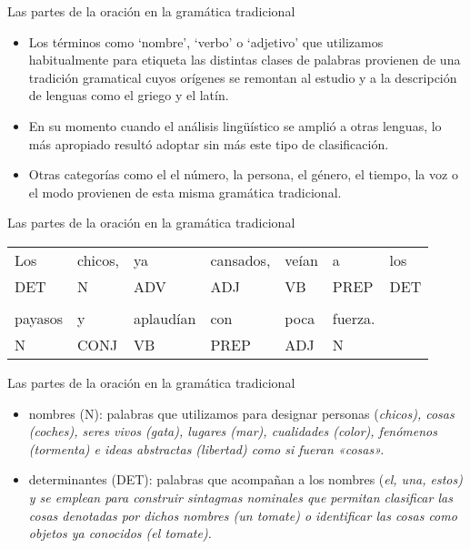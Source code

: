 \documentclass{beamer}
\begin{document}
\begin{frame}{Las partes de la oración en la gramática tradicional}

\begin{itemize}
    \item Los términos como `nombre', `verbo' o `adjetivo' que utilizamos habitualmente para etiqueta las distintas clases de palabras provienen de una tradición gramatical cuyos orígenes se remontan al estudio y a la descripción de lenguas como el griego y el latín.
    \item En su momento cuando el análisis lingüístico se amplió a otras lenguas, lo más apropiado resultó adoptar sin más este tipo de clasificación. 
    \item Otras categorías como el el número, la persona, el género, el tiempo, la voz o el modo provienen de esta misma gramática tradicional.
\end{itemize}

\end{frame}


\begin{frame}{Las partes de la oración en la gramática tradicional}

\begin{center}
\begin{tabular}{l l l l l l l}
Los & chicos, & ya & cansados, & veían & a & los \\
DET & N & ADV & ADJ & VB & PREP & DET \\
& & & & & & \\
payasos & y & aplaudían & con & poca & fuerza. & \\
N & CONJ & VB & PREP & ADJ & N & \\
\end{tabular}
\end{center}	

\end{frame}

\begin{frame}{Las partes de la oración en la gramática tradicional}

\begin{itemize}
    \item nombres (N): palabras que utilizamos para designar personas (\it{chicos}), cosas (\it{coches}), seres vivos (\it{gata}), lugares (\it{mar}), cualidades (\it{color}), fenómenos (\it{tormenta}) e ideas abstractas (\it{libertad}) como si fueran «cosas». 
    \item determinantes (DET): palabras que acompañan a los nombres (\it{el, una, estos}) y se emplean para construir sintagmas nominales que permitan clasificar las cosas denotadas por dichos nombres (\it{un tomate}) o identificar las cosas como objetos ya conocidos (\it{el tomate}).   
\end{itemize}

\end{frame}
\end{document}
